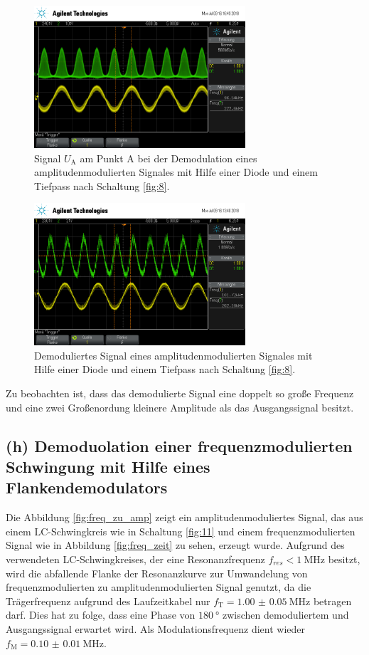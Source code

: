 \begin{figure}
  \centering
  \includegraphics[width=0.7\textwidth]{osci/amp_demod_diode_A.png}
  \caption{Signal $U_{\text{A}}$ am Punkt A bei der Demodulation eines amplitudenmodulierten Signales mit Hilfe einer
  Diode und einem Tiefpass nach Schaltung \ref{fig:8}.}
  \label{fig:diode_punkt_A}
\end{figure}


\begin{figure}
  \centering
  \includegraphics[width=0.7\textwidth]{osci/amp_demod_diode.png}
  \caption{Demoduliertes Signal eines amplitudenmodulierten Signales mit Hilfe einer
  Diode und einem Tiefpass nach Schaltung \ref{fig:8}.}
\label{fig:diode_demod_amp}
\end{figure}

Zu beobachten ist, dass das demodulierte Signal eine doppelt so große Frequenz
und eine zwei Großenordung kleinere Amplitude als das Ausgangssignal
besitzt.

\subsection{(h) Demoduolation einer frequenzmodulierten Schwingung
mit Hilfe eines Flankendemodulators}
\label{subsec:auswertung_h}
Die Abbildung \ref{fig:freq_zu_amp}
zeigt ein amplitudenmoduliertes Signal, das aus einem LC-Schwingkreis
wie in Schaltung \ref{fig:11} und einem frequenzmodulierten Signal wie in Abbildung
\ref{fig:freq_zeit} zu sehen, erzeugt wurde.
Aufgrund des verwendeten LC-Schwingkreises, der eine Resonanzfrequenz $f_{res}< \SI{1}{\mega\hertz}$ besitzt,
wird die abfallende Flanke der Resonanzkurve zur Umwandelung von
frequenzmodulierten zu amplitudenmodulierten Signal genutzt,
da die Trägerfrequenz
aufgrund des Laufzeitkabel nur $f_{\text{T}}=\SI{1.00(5)}{\mega\hertz}$ betragen darf.
Dies hat zu folge, dass eine Phase von $\SI{180}{\degree}$ zwischen demoduliertem und Ausgangssignal
erwartet wird.
Als Modulationsfrequenz dient wieder $f_{\text{M}}=\SI{0.10(1)}{\mega\hertz}$.

